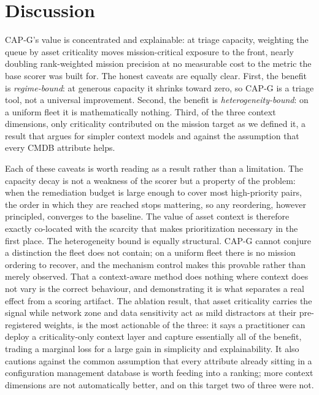 \section{Discussion}
\label{sec:discussion}

CAP-G's value is concentrated and explainable: at triage capacity, weighting the queue by
asset criticality moves mission-critical exposure to the front, nearly doubling
rank-weighted mission precision at no measurable cost to the metric the base scorer was built
for. The honest caveats are equally clear. First, the benefit is \emph{regime-bound}: at
generous capacity it shrinks toward zero, so CAP-G is a triage tool, not a universal
improvement. Second, the benefit is \emph{heterogeneity-bound}: on a uniform fleet it is
mathematically nothing. Third, of the three context dimensions, only criticality
contributed on the mission target as we defined it, a result that argues for simpler
context models and against the assumption that every CMDB attribute helps.

Each of these caveats is worth reading as a result rather than a limitation. The capacity decay
is not a weakness of the scorer but a property of the problem: when the remediation budget is
large enough to cover most high-priority pairs, the order in which they are reached stops
mattering, so any reordering, however principled, converges to the baseline. The value of
asset context is therefore exactly co-located with the scarcity that makes prioritization
necessary in the first place. The heterogeneity bound is equally structural. CAP-G cannot
conjure a distinction the fleet does not contain; on a uniform fleet there is no mission
ordering to recover, and the mechanism control makes this provable rather than merely observed.
That a context-aware method does nothing where context does not vary is the correct behaviour,
and demonstrating it is what separates a real effect from a scoring artifact. The ablation
result, that asset criticality carries the signal while network zone and data sensitivity act as
mild distractors at their pre-registered weights, is the most actionable of the three: it says a
practitioner can deploy a criticality-only context layer and capture essentially all of the
benefit, trading a marginal loss for a large gain in simplicity and explainability. It also
cautions against the common assumption that every attribute already sitting in a configuration
management database is worth feeding into a ranking; more context dimensions are not
automatically better, and on this target two of three were not.

